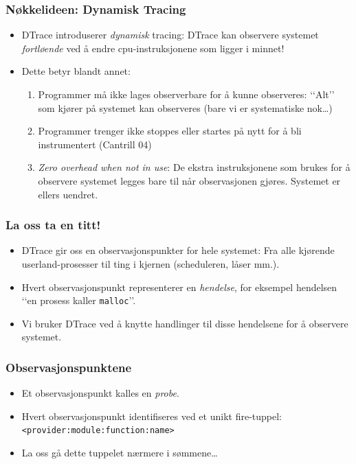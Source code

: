 \documentclass{beamer}
\begin{document}
\begin{frame}
    \frametitle{Nøkkelideen: Dynamisk Tracing}
    \begin{itemize}

          \item DTrace introduserer \emph{dynamisk} tracing: DTrace kan
              observere systemet \emph{fortløende} ved å endre
         cpu-instruksjonene som ligger i minnet!

     \item Dette betyr blandt annet:

         \begin{enumerate}
             \item Programmer må ikke lages observerbare for å kunne observeres:
            ‘‘Alt’’ som kjører på systemet kan observeres (bare vi er
            systematiske nok…)

        \item Programmer trenger ikke stoppes eller startes på nytt for å bli
            instrumentert (Cantrill 04)

        \item \emph{Zero overhead when not in use}: De ekstra instruksjonene som
            brukes for å observere systemet legges bare til når observasjonen
            gjøres. Systemet er ellers uendret.
         \end{enumerate}
 \end{itemize}
 \end{frame}

 \begin{frame}
    \frametitle{La oss ta en titt!}
 \begin{itemize}

     \item DTrace gir oss en observasjonspunkter for hele systemet:
         Fra alle kjørende userland-prosesser til ting i kjernen
         (scheduleren, låser mm.).

     \item Hvert observasjonspunkt representerer en \emph{hendelse},
         for eksempel hendelsen ‘‘en prosess kaller \texttt{malloc}’’.

     \item Vi bruker DTrace ved å knytte handlinger til disse hendelsene
         for å observere systemet.
 \end{itemize}
 \end{frame}

 \begin{frame}
    \frametitle{Observasjonspunktene}

 \begin{itemize}

     \item Et observasjonspunkt kalles en \emph{probe}.

     \item Hvert observasjonspunkt identifiseres ved et unikt fire-tuppel:
         \texttt{<provider:module:function:name>}

    \item La oss gå dette tuppelet nærmere i sømmene…

 \end{itemize}
 \end{frame}
\end{document}
